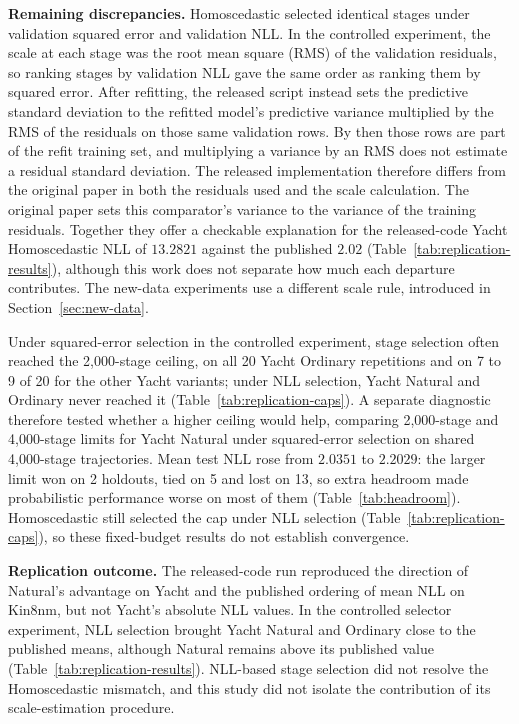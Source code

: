 \textbf{Remaining discrepancies.}
Homoscedastic selected identical stages under validation squared error and validation NLL.
In the controlled experiment, the scale at each stage was the root mean square (RMS) of the validation residuals, so ranking stages by validation NLL gave the same order as ranking them by squared error.
After refitting, the released script instead sets the predictive standard deviation to the refitted model's predictive variance multiplied by the RMS of the residuals on those same validation rows.
By then those rows are part of the refit training set, and multiplying a variance by an RMS does not estimate a residual standard deviation.
The released implementation therefore differs from the original paper in both the residuals used and the scale calculation.
The original paper sets this comparator's variance to the variance of the training residuals.
Together they offer a checkable explanation for the released-code Yacht Homoscedastic NLL of $13.2821$ against the published $2.02$ (Table~\ref{tab:replication-results}), although this work does not separate how much each departure contributes.
The new-data experiments use a different scale rule, introduced in Section~\ref{sec:new-data}.

Under squared-error selection in the controlled experiment, stage selection often reached the 2{,}000-stage ceiling, on all 20 Yacht Ordinary repetitions and on 7 to 9 of 20 for the other Yacht variants; under NLL selection, Yacht Natural and Ordinary never reached it (Table~\ref{tab:replication-caps}).
A separate diagnostic therefore tested whether a higher ceiling would help, comparing 2{,}000-stage and 4{,}000-stage limits for Yacht Natural under squared-error selection on shared 4{,}000-stage trajectories.
Mean test NLL rose from $2.0351$ to $2.2029$: the larger limit won on 2 holdouts, tied on 5 and lost on 13, so extra headroom made probabilistic performance worse on most of them (Table~\ref{tab:headroom}).
Homoscedastic still selected the cap under NLL selection (Table~\ref{tab:replication-caps}), so these fixed-budget results do not establish convergence.

\textbf{Replication outcome.}
The released-code run reproduced the direction of Natural's advantage on Yacht and the published ordering of mean NLL on Kin8nm, but not Yacht's absolute NLL values.
In the controlled selector experiment, NLL selection brought Yacht Natural and Ordinary close to the published means, although Natural remains above its published value (Table~\ref{tab:replication-results}).
NLL-based stage selection did not resolve the Homoscedastic mismatch, and this study did not isolate the contribution of its scale-estimation procedure.
